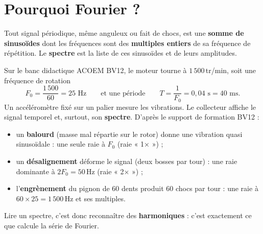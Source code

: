 \documentclass[a4paper,11pt]{article}
\begin{document}
\newpage
\tableofcontents
\newpage

\needspace{7cm}
\section{Pourquoi Fourier ?}\label{sec:pourquoi}

\begin{tcolorbox}[colback=uimmlightblue!30, colframe=uimmblue, boxrule=0.8pt, arc=3pt,
  title={\textbf{\textsf{L'essentiel en une phrase}}}, fonttitle=\bfseries\color{white}, coltitle=white]
Tout signal périodique, même anguleux ou fait de chocs, est une \textbf{somme de sinusoïdes} dont les fréquences sont des \textbf{multiples entiers} de sa fréquence de répétition. Le \textbf{spectre} est la liste de ces sinusoïdes et de leurs amplitudes.
\end{tcolorbox}

\begin{appliindus}\label{ex:filrouge}
Sur le banc didactique ACOEM BV12, le moteur tourne à $1\,500$\,tr/min, soit une fréquence de rotation
\[
F_0 = \frac{1\,500}{60} = 25 \text{ Hz} \qquad\text{et une période}\qquad T = \frac{1}{F_0} = 0{,}04 \text{ s} = 40 \text{ ms.}
\]
Un accéléromètre fixé sur un palier mesure les vibrations. Le collecteur affiche le signal temporel et, surtout, son \textbf{spectre}. D'après le support de formation BV12 :
\begin{itemize}
  \item un \textbf{balourd} (masse mal répartie sur le rotor) donne une vibration quasi sinusoïdale : une seule raie à $F_0$ (raie « 1× ») ;
  \item un \textbf{désalignement} déforme le signal (deux bosses par tour) : une raie dominante à $2F_0 = 50$\,Hz (raie « 2× ») ;
  \item l'\textbf{engrènement} du pignon de $60$ dents produit $60$ chocs par tour : une raie à $60\times 25 = 1\,500$\,Hz et ses multiples.
\end{itemize}
Lire un spectre, c'est donc reconnaître des \textbf{harmoniques} : c'est exactement ce que calcule la série de Fourier.
\end{appliindus}
\end{document}
